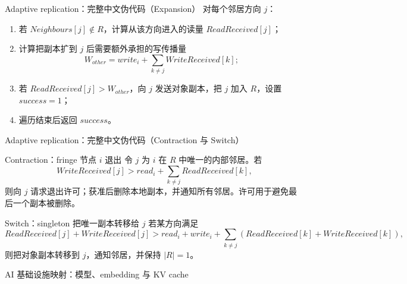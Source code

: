\documentclass[UTF8,fontset=none,aspectratio=169,10pt]{beamer}
\begin{document}
{\begin{frame}{Adaptive replication：完整中文伪代码（Expansion）}
\small
对每个邻居方向 $j$：
\begin{enumerate}
  \item 若 $Neighbours[j]\notin R$，计算从该方向进入的读量 $ReadReceived[j]$；
  \item 计算把副本扩到 $j$ 后需要额外承担的写传播量
  \[
  W_{other}=write_i+\sum_{k\neq j}WriteReceived[k];
  \]
  \item 若 $ReadReceived[j]>W_{other}$，向 $j$ 发送对象副本，把 $j$ 加入 $R$，设置 $success=1$；
  \item 遍历结束后返回 $success$。
\end{enumerate}
\end{frame}

\begin{frame}{Adaptive replication：完整中文伪代码（Contraction 与 Switch）}
\scriptsize
\begin{block}{Contraction：fringe 节点 $i$ 退出}
令 $j$ 为 $i$ 在 $R$ 中唯一的内部邻居。若
\[
WriteReceived[j]>read_i+\sum_{k\neq j}ReadReceived[k],
\]
则向 $j$ 请求退出许可；获准后删除本地副本，并通知所有邻居。许可用于避免最后一个副本被删除。
\end{block}
\begin{block}{Switch：singleton 把唯一副本转移给 $j$}
若某方向满足
\[
ReadReceived[j]+WriteReceived[j]>
read_i+write_i+\sum_{k\neq j}(ReadReceived[k]+WriteReceived[k]),
\]
则把对象副本转移到 $j$，通知邻居，并保持 $|R|=1$。
\end{block}
\end{frame}

\begin{frame}{AI 基础设施映射：模型、embedding 与 KV cache}
\begin{columns}[T,onlytextwidth]
\end{columns}
\vfill
\begin{center}
\end{center}
\end{frame}

}
\end{document}
